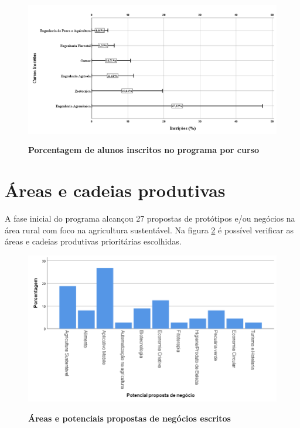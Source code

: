 \begin{figure}[!htb]
\caption{\textbf{Porcentagem de alunos inscritos no programa por curso}}
\centering
\includegraphics[scale=0.3]{Imagens/inscritos.png}
\label{figura_10}
\end{figure}



\section{Áreas e cadeias produtivas}

A fase inicial do programa alcançou 27 propostas de protótipos e/ou negócios na área rural com foco na agricultura sustentável. Na figura \ref{figura_11} é possível verificar as áreas e cadeias produtivas prioritárias escolhidas.

\begin{figure}[!htb]
\centering
\caption{\textbf{Áreas e potenciais propostas de negócios escritos}}
\includegraphics[scale=0.3]{Imagens/propostas_negocios.png}
\label{figura_11}
\end{figure}
\newpage




